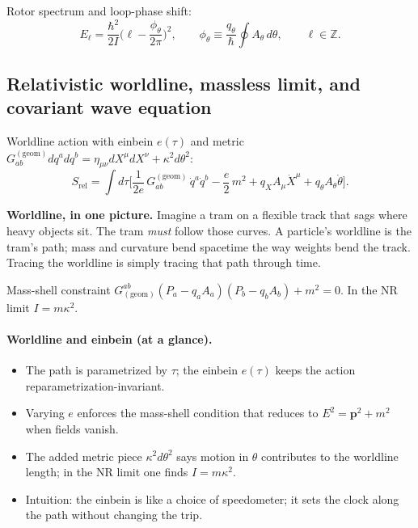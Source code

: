 Rotor spectrum and loop-phase shift:
\begin{equation}
 E_\ell=\frac{\hbar^2}{2I}\Big(\ell-\frac{\phi_\theta}{2\pi}\Big)^2,\qquad \phi_\theta\equiv\frac{q_\theta}{\hbar}\oint A_\theta\,d\theta,\qquad \ell\in\mathbb Z.
\end{equation}

\subsection{Relativistic worldline, massless limit, and covariant wave equation}\label{sec:relativistic-worldline}
Worldline action with einbein $e(\tau)$ and metric $G^{(\mathrm{geom})}_{ab}dq^adq^b=\eta_{\mu\nu}dX^\mu dX^\nu+\kappa^2 d\theta^2$:
\begin{equation}
 S_{\mathrm{rel}}=\int d\tau\Big[\frac{1}{2e}\,G^{(\mathrm{geom})}_{ab}\,\dot q^a\dot q^b - \frac{e}{2}\,m^2 + q_X A_\mu\dot X^\mu + q_\theta A_\theta\dot\theta\Big].
\end{equation}

    \begin{idea}
      	\textbf{Worldline, in one picture.} Imagine a tram on a flexible track that sags where heavy objects sit. The tram \emph{must} follow those curves. A particle’s worldline is the tram’s path; mass and curvature bend spacetime the way weights bend the track. Tracing the worldline is simply tracing that path through time.
    \end{idea}
Mass-shell constraint $G^{ab}_{\mathrm{(geom)}}(P_a-q_aA_a)(P_b-q_bA_b)+m^2=0$. In the NR limit $I=m\kappa^2$.

\paragraph{Worldline and einbein (at a glance).}
\begin{itemize}
  \item The path is parametrized by $\tau$; the einbein $e(\tau)$ keeps the action reparametrization-invariant.
  \item Varying $e$ enforces the mass-shell condition that reduces to $E^2=\bm p^2+m^2$ when fields vanish.
  \item The added metric piece $\kappa^2 d\theta^2$ says motion in $\theta$ contributes to the worldline length; in the NR limit one finds $I=m\kappa^2$.
  \item Intuition: the einbein is like a choice of speedometer; it sets the clock along the path without changing the trip.
\end{itemize}

